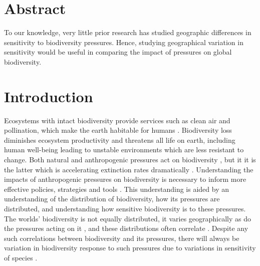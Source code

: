 \documentclass[11pt, a4paper, titlepage]{article}
\begin{document}
	\newpage
	
	\section*{Abstract}
	 To our knowledge, very little prior research has studied geographic differences in sensitivity to biodiversity pressures. Hence, studying geographical variation in  sensitivity would be useful in comparing the impact of pressures on global biodiversity.
	
\newpage
\tableofcontents
\newpage
	
    \section*{Introduction}
    	
	Ecosystems with intact biodiversity provide services such as clean air and pollination, which make the earth habitable for humans \citep{leemans2003millennium}. Biodiversity loss diminishes ecosystem productivity \citep{duffy2017biodiversity} and threatens all life on earth, including human well-being \citep{diaz2006biodiversity} leading to unstable environments which are less resistant to change. Both natural and anthropogenic pressures act on biodiversity \citep{nobel2020anthropogenic}, but it it is the latter which is accelerating extinction rates dramatically \citep{ceballos2015accelerated}. Understanding the impacts of anthropogenic pressures on biodiversity is necessary to inform more effective policies, strategies and tools \citep{diaz2006biodiversity}. This understanding is aided by an understanding of the  distribution of biodiversity, how its pressures are distributed, and understanding how sensitive biodiversity is to these pressures. The worlds' biodiversity is not equally distributed, it varies geographically \citep{gaston2000global, ricklefs2004comprehensive, mcrae2017diversity}  as do the pressures acting on it \citep{millennium2005ecosystems, sala2000global, bowler2020mapping}, and these distributions often correlate \citep{ament2019compatibility, Velde2022}. Despite any such correlations between biodiversity and its pressures, there will always be variation in biodiversity response to such pressures due to variations in sensitivity of species \citep{bowler2020mapping}. 
	
\end{document}
